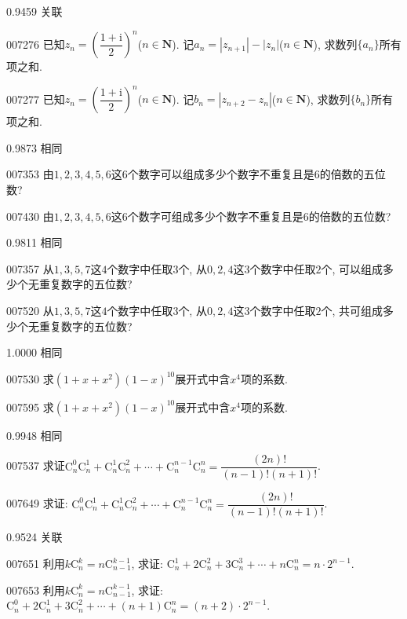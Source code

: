 \documentclass[10pt,a4paper]{article}
\begin{document}
0.9459 关联

007276	已知$z_n=(\dfrac{1+\mathrm{i}}2)^n$($n\in \mathbf{N}$). 记$a_n=|z_{n+1}|-|z_n|$($n\in \mathbf{N}$), 求数列$\{a_n\}$所有项之和.

007277	已知$z_n=(\dfrac{1+\mathrm{i}}2)^n$($n\in \mathbf{N}$). 记$b_n=|z_{n+2}-z_n|$($n\in \mathbf{N}$), 求数列$\{b_n\}$所有项之和.



0.9873 相同

007353	由$1, 2, 3, 4, 5, 6$这$6$个数字可以组成多少个数字不重复且是$6$的倍数的五位数?

007430	由$1, 2, 3, 4, 5, 6$这$6$个数字可组成多少个数字不重复且是$6$的倍数的五位数?



0.9811 相同

007357	从$1, 3, 5, 7$这$4$个数字中任取$3$个, 从$0, 2, 4$这$3$个数字中任取$2$个, 可以组成多少个无重复数字的五位数?

007520	从$1, 3, 5, 7$这$4$个数字中任取$3$个, 从$0, 2, 4$这$3$个数字中任取$2$个, 共可组成多少个无重复数字的五位数?



1.0000 相同

007530	求$(1+x+x^2)(1-x)^{10}$展开式中含$x^4$项的系数.

007595	求$(1+x+x^2)(1-x)^{10}$展开式中含$x^4$项的系数.



0.9948 相同

007537	求证$\mathrm{C}_n^0\mathrm{C}_n^1+\mathrm{C}_n^1\mathrm{C}_n^2+\cdots +\mathrm{C}_n^{n-1}\mathrm{C}_n^n=\dfrac{(2n)!}{(n-1)!(n+1)!}$.

007649	求证: $\mathrm{C}_n^0\mathrm{C}_n^1+\mathrm{C}_n^1\mathrm{C}_n^2+\cdots +\mathrm{C}_n^{n-1}\mathrm{C}_n^n=\dfrac{(2n)!}{(n-1)!(n+1)!}$.



0.9524 关联

007651	利用$k\mathrm{C}_n^k=n\mathrm{C}_{n-1}^{k-1}$, 求证: $\mathrm{C}_n^1+2\mathrm{C}_n^2+3\mathrm{C}_n^3+\cdots +n\mathrm{C}_n^n=n\cdot 2^{n-1}$.

007653	利用$k\mathrm{C}_n^k=n\mathrm{C}_{n-1}^{k-1}$, 求证: $\mathrm{C}_n^0+2\mathrm{C}_n^1+3\mathrm{C}_n^2+\cdots +(n+1)\mathrm{C}_n^n=(n+2)\cdot 2^{n-1}$.
\end{document}

